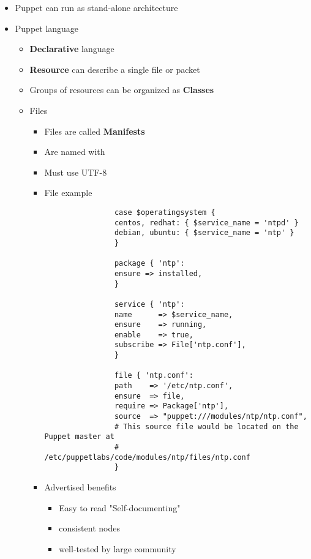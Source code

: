 \begin{itemize}
\begin{enumerate}
		\end{enumerate}
		\item Puppet can run as stand-alone architecture
		\item Puppet language
		\begin{itemize}
			\item \textbf{Declarative} language
			\item \textbf{Resource} can describe a single file or packet
			\item Groups of resources can be organized as \textbf{Classes}
			\item Files
			\begin{itemize}
				\item Files are called \textbf{Manifests}
				\item Are named with 
				\item Must use UTF-8
				\item File example\\
				\begin{verbatim}
				case $operatingsystem {
				centos, redhat: { $service_name = 'ntpd' }
				debian, ubuntu: { $service_name = 'ntp' }
				}
				
				package { 'ntp':
				ensure => installed,
				}
				
				service { 'ntp':
				name      => $service_name,
				ensure    => running,
				enable    => true,
				subscribe => File['ntp.conf'],
				}
				
				file { 'ntp.conf':
				path    => '/etc/ntp.conf',
				ensure  => file,
				require => Package['ntp'],
				source  => "puppet:///modules/ntp/ntp.conf",
				# This source file would be located on the Puppet master at
				# /etc/puppetlabs/code/modules/ntp/files/ntp.conf
				}
				\end{verbatim}
				\item Advertised benefits
				\begin{itemize}
					\item Easy to read "Self-documenting"
					\item consistent nodes
					\item well-tested by large community
				\end{itemize}
			\end{itemize}
		\end{itemize}
	\end{itemize}
